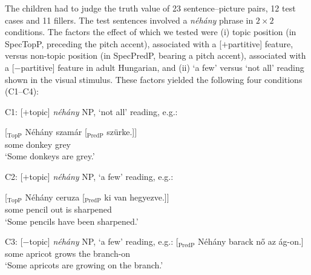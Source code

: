 \documentclass[output=paper]{langscibook}
\begin{document}
The children had to judge the truth value of 23 sentence–picture pairs, 12 test cases and 11 fillers. The test sentences involved a \textit{néhány} phrase in $2\times 2$ conditions. The factors the effect of which we tested were (i) topic position (in SpecTopP, preceding the pitch accent), associated with a [$+$partitive] feature, versus non-topic position (in SpecPredP, bearing a pitch accent), associated with a [$-$partitive] feature in adult Hungarian, and (ii) `a few' versus `not all' reading shown in the visual stimulus. These factors yielded the following four conditions (C1--C4):

\pagebreak

\noindent C1: [$+$topic] \textit{néhány} NP, `not all' reading, e.g.:

\ea
\gll \label{kis-zet:szamar} [$_\text{TopP}$ 	Néhány 	szamár 	[$_\text{PredP}$ 	szürke.]]\\  
     {} {} some donkey {} grey\\ 
\glt `Some donkeys are grey.'
\z


\vspace{1ex}

\noindent C2: [$+$topic] \textit{néhány} NP, `a few' reading, e.g.:

\ea
\gll \label{kis-zet:ceruza} [$_\text{TopP}$ 	Néhány ceruza 	[$_\text{PredP}$ 	ki 		van 	hegyezve.]]\\  
    {} {} some pencil {} out is sharpened\\ 
\glt `Some pencils have been sharpened.'
\z


\vspace{1ex}

\noindent C3: [$-$topic] \textit{néhány} NP, `a few' reading, e.g.:
\ea
\gll \label{kis-zet:barack}[$_\text{PredP}$ Néhány barack nő az ág-on.]\\ {} some apricot grows the branch-on\\ 
\glt `Some apricots are growing on the branch.'
\z
\end{document}
